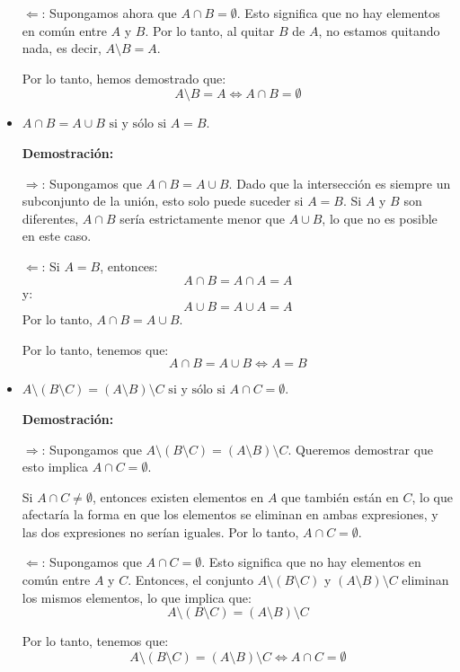 \begin{solution}
\begin{itemize}
        \(\Leftarrow\): Supongamos ahora que \( A \cap B = \emptyset \). Esto significa que no hay elementos en común entre \( A \) y \( B \). Por lo tanto, al quitar \( B \) de \( A \), no estamos quitando nada, es decir, \( A \setminus B = A \).
        
        Por lo tanto, hemos demostrado que:
        \[
        A \setminus B = A \iff A \cap B = \emptyset
        \]
        \item $A \cap B = A \cup B \text{ si y sólo si } A = B$.
        
        \textbf{Demostración:}
        
        \(\Rightarrow\): Supongamos que \( A \cap B = A \cup B \). Dado que la intersección es siempre un subconjunto de la unión, esto solo puede suceder si \( A = B \). Si \( A \) y \( B \) son diferentes, \( A \cap B \) sería estrictamente menor que \( A \cup B \), lo que no es posible en este caso.
        
        \(\Leftarrow\): Si \( A = B \), entonces:
          \[
          A \cap B = A \cap A = A
          \]
          y:
          \[
          A \cup B = A \cup A = A
          \]
          Por lo tanto, \( A \cap B = A \cup B \).
        
        Por lo tanto, tenemos que:
        \[
        A \cap B = A \cup B \iff A = B
        \]
        
        
        \item $A \setminus (B \setminus C) = (A \setminus B) \setminus C \text{ si y sólo si } A \cap C = \emptyset$.
        
        \textbf{Demostración:}

        \(\Rightarrow\): Supongamos que \( A \setminus (B \setminus C) = (A \setminus B) \setminus C \). Queremos demostrar que esto implica \( A \cap C = \emptyset \). 
        
        Si \( A \cap C \neq \emptyset \), entonces existen elementos en \( A \) que también están en \( C \), lo que afectaría la forma en que los elementos se eliminan en ambas expresiones, y las dos expresiones no serían iguales. Por lo tanto, \( A \cap C = \emptyset \).
        
        \(\Leftarrow\): Supongamos que \( A \cap C = \emptyset \). Esto significa que no hay elementos en común entre \( A \) y \( C \). Entonces, el conjunto \( A \setminus (B \setminus C) \) y \( (A \setminus B) \setminus C \) eliminan los mismos elementos, lo que implica que:
          \[
          A \setminus (B \setminus C) = (A \setminus B) \setminus C
          \]
        
        Por lo tanto, tenemos que:
        \[
        A \setminus (B \setminus C) = (A \setminus B) \setminus C \iff A \cap C = \emptyset
        \]
    \end{itemize}
\end{solution}